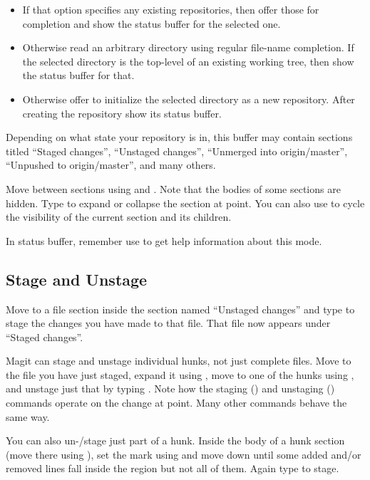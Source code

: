 \begin{itemize}
\item If that option specifies any existing repositories, then offer those for completion and show the status buffer for the selected one.
\item Otherwise read an arbitrary directory using regular file-name completion.  If the selected directory is the top-level of an existing working tree, then show the status buffer for that.
\item Otherwise offer to initialize the selected directory as a new repository.  After creating the repository show its status buffer.
\end{itemize}

Depending on what state your repository is in, this buffer may contain sections titled ``Staged changes'', ``Unstaged changes'', ``Unmerged into origin/master'', ``Unpushed to origin/master'', and many others.

Move between sections using  and .
Note that the bodies of some sections are hidden.
Type  to expand or collapse the section at point.
You can also use  to cycle the visibility of the current section and its children. 

\begin{tcolorbox}
  In status buffer, remember use  to get help information about this mode.
\end{tcolorbox}


\subsection{Stage and Unstage}
\label{sec:stage-unstage}

Move to a file section inside the section named ``Unstaged changes'' and type  to stage the changes you have made to that file.
That file now appears under ``Staged changes''.

Magit can stage and unstage individual hunks, not just complete files.
Move to the file you have just staged, expand it using , move to one of the hunks using , and unstage just that by typing .
Note how the staging () and unstaging () commands operate on the change at point.
Many other commands behave the same way.


You can also un-/stage just part of a hunk.
Inside the body of a hunk section (move there using ), set the mark using  and move down until some added and/or removed lines fall inside the region but not all of them.
Again type  to stage.

